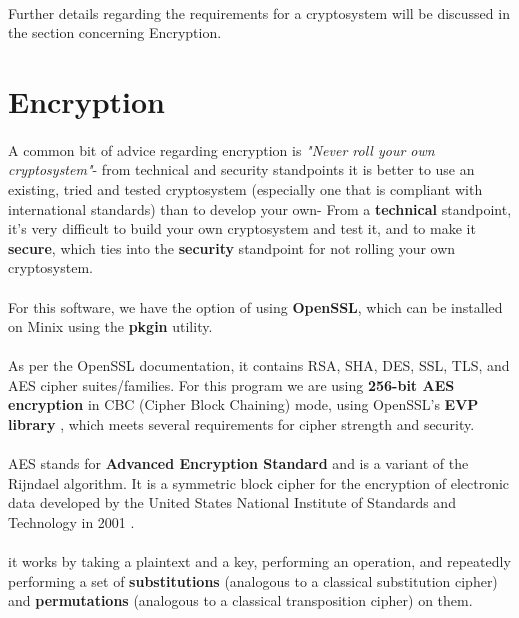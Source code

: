 \documentclass{article}
\begin{document}
    \paragraph{}Further details regarding the requirements for a cryptosystem will be discussed in the section concerning Encryption.

\section{Encryption}
    \paragraph{}A common bit of advice regarding encryption is \textit{"Never roll your own cryptosystem"}- from technical and security standpoints it is better to use an existing, tried and tested cryptosystem (especially one that is compliant with international standards) than to develop your own- From a \textbf{technical} standpoint, it's very difficult to build your own cryptosystem and test it, and to make it \textbf{secure}, which ties into the \textbf{security} standpoint for not rolling your own cryptosystem.
    
    \paragraph{}For this software, we have the option of using \textbf{OpenSSL}, which can be installed on Minix using the \textbf{pkgin} utility.
    
    \paragraph{}As per the OpenSSL documentation, it contains RSA, SHA, DES, SSL, TLS, and AES cipher suites/families. For this program we are using \textbf{256-bit AES encryption} in CBC (Cipher Block Chaining) mode, using OpenSSL's \textbf{EVP library} \parencite{openssl_evp}, which meets several  requirements for cipher strength and security.

    \paragraph{}AES stands for \textbf{Advanced Encryption Standard} and is a variant of the Rijndael algorithm. It is a symmetric block cipher for the encryption of electronic data developed by the United States National Institute of Standards and Technology in 2001 \parencite{aes_256_nist}.
    \paragraph{}it works by taking a plaintext and a key, performing an operation, and repeatedly performing a set of \textbf{substitutions} (analogous to a classical substitution cipher) and \textbf{permutations} (analogous to a classical transposition cipher) on them.
\end{document}
